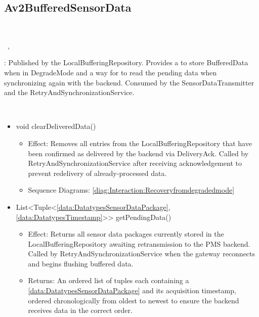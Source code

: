  \subsection{Av2BufferedSensorData}\label{int:InterfacesAv2BufferedSensorData}
    \begin{description}
      \item[Provided by:] \iconcomponent{}~
      \item[Required by:] \iconcomponent{}~, \iconcomponent{}~ 
           \item[Description]: Published by the LocalBufferingRepository. Provides a to store BufferedData when in DegradeMode and a way for to read the pending data when synchronizing again with the backend. Consumed by the SensorDataTransmitter and the RetryAndSynchronizationService.
      \item[Operations:] ~
    \begin{itemize}[noitemsep,nolistsep,leftmargin=-.25cm]
      \item \textsf{void clearDeliveredData()}
        \begin{itemize}[noitemsep,nolistsep]
           \item Effect: Removes all entries from the LocalBufferingRepository that have been confirmed as delivered by the backend via DeliveryAck. Called by RetryAndSynchronizationService after receiving acknowledgement to prevent redelivery of already-processed data. 
           \item Sequence Diagrams: \cref{diag:Interaction:Recoveryfromdegradedmode}
        \end{itemize}
      \item \textsf{List\textless{}Tuple\textless{}\ref{data:DatatypesSensorDataPackage}, \ref{data:DatatypesTimestamp}\textgreater{}\textgreater{} getPendingData()}
        \begin{itemize}[noitemsep,nolistsep]
           \item Effect: Returns all sensor data packages currently stored in the LocalBufferingRepository awaiting retransmission to the PMS backend. Called by RetryAndSynchronizationService when the gateway reconnects and begins flushing buffered data. 
           \item Returns: An ordered list of tuples each containing a \ref{data:DatatypesSensorDataPackage} and its acquisition timestamp, ordered chronologically from oldest to newest to ensure the backend receives data in the correct order.

\end{itemize}
\end{itemize}
\end{description}
